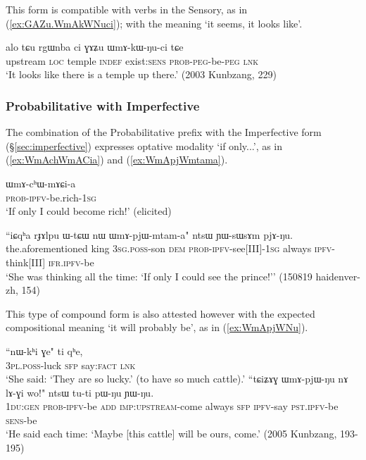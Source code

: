 This form is compatible with verbs in the Sensory, as in (\ref{ex:GAZu.WmAkWNuci}); with the meaning `it seems, it looks like'.

\begin{exe}
\ex \label{ex:GAZu.WmAkWNuci}
\gll alo tɕu rgɯnba ci ɣɤʑu ɯmɤ-kɯ-ŋu-ci tɕe \\
upstream \textsc{loc} temple \textsc{indef} exist:\textsc{sens} \textsc{prob}-\textsc{peg}-be-\textsc{peg} \textsc{lnk} \\
\glt `It looks like there is a temple up there.' (2003 Kunbzang, 229)
\end{exe}

\subsubsection{Probabilitative with Imperfective} \label{sec:WmA.ipfv}
The combination of the Probabilitative prefix with the Imperfective form (§\ref{sec:imperfective}) expresses optative modality `if only...', as in (\ref{ex:WmAchWmACia}) and (\ref{ex:WmApjWmtama}).

\begin{exe}
\ex \label{ex:WmAchWmACia}
\gll ɯmɤ-cʰɯ-mɤɕi-a \\
\textsc{prob}-\textsc{ipfv}-be.rich-\textsc{1sg} \\
\glt `If only I could become rich!' (elicited)
\end{exe}

\begin{exe}
\ex \label{ex:WmApjWmtama}
\gll ``iɕqʰa rɟɤlpu ɯ-tɕɯ nɯ ɯmɤ-pjɯ-mtam-a" ntsɯ ɲɯ-sɯsɤm pjɤ-ŋu. \\
the.aforementioned king \textsc{3sg}.\textsc{poss}-son \textsc{dem} \textsc{prob}-\textsc{ipfv}-see[III]-\textsc{1sg} always \textsc{ipfv}-think[III] \textsc{ifr}.\textsc{ipfv}-be \\
\glt `She was thinking all the time: `If only I could see the prince!'' (150819 haidenver-zh, 154)
\end{exe}

This type of compound form is also attested however with the expected compositional meaning `it will probably be', as in (\ref{ex:WmApjWNu}).

\begin{exe}
\ex 
\begin{xlist}
\ex  
\gll ``nɯ-kʰi ɣe" ti qʰe, \\
\textsc{3pl}.\textsc{poss}-luck \textsc{sfp} say:\textsc{fact} \textsc{lnk} \\
\glt `She said: `They are so lucky.' (to have so much cattle).' 
\ex \label{ex:WmApjWNu}
\gll ``tɕiʑɤɣ ɯmɤ-pjɯ-ŋu nɤ lɤ-ɣi wo!" ntsɯ tu-ti pɯ-ŋu ɲɯ-ŋu. \\
\textsc{1du}:\textsc{gen} \textsc{prob}-\textsc{ipfv}-be \textsc{add} \textsc{imp}:\textsc{upstream}-come always \textsc{sfp} \textsc{ipfv}-say \textsc{pst}.\textsc{ipfv}-be \textsc{sens}-be \\
\glt `He said each time: `Maybe [this cattle] will be ours, come.' (2005 Kunbzang, 193-195)
\end{xlist}
 \end{exe}
 
